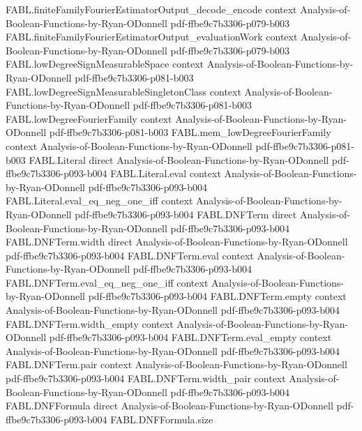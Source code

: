 \begin{theorem}
  {FABL.finiteFamilyFourierEstimatorOutput_decode_encode}
  {context}
  {Analysis-of-Boolean-Functions-by-Ryan-ODonnell}
  {pdf-ffbe9c7b3306-p079-b003}
\proofstep
  {FABL.finiteFamilyFourierEstimatorOutput_evaluationWork}
  {context}
  {Analysis-of-Boolean-Functions-by-Ryan-ODonnell}
  {pdf-ffbe9c7b3306-p079-b003}
\proofstep
  {FABL.lowDegreeSignMeasurableSpace}
  {context}
  {Analysis-of-Boolean-Functions-by-Ryan-ODonnell}
  {pdf-ffbe9c7b3306-p081-b003}
\proofstep
  {FABL.lowDegreeSignMeasurableSingletonClass}
  {context}
  {Analysis-of-Boolean-Functions-by-Ryan-ODonnell}
  {pdf-ffbe9c7b3306-p081-b003}
\proofstep
  {FABL.lowDegreeFourierFamily}
  {context}
  {Analysis-of-Boolean-Functions-by-Ryan-ODonnell}
  {pdf-ffbe9c7b3306-p081-b003}
\proofstep
  {FABL.mem_lowDegreeFourierFamily}
  {context}
  {Analysis-of-Boolean-Functions-by-Ryan-ODonnell}
  {pdf-ffbe9c7b3306-p081-b003}
\proofstep
  {FABL.Literal}
  {direct}
  {Analysis-of-Boolean-Functions-by-Ryan-ODonnell}
  {pdf-ffbe9c7b3306-p093-b004}
\proofstep
  {FABL.Literal.eval}
  {context}
  {Analysis-of-Boolean-Functions-by-Ryan-ODonnell}
  {pdf-ffbe9c7b3306-p093-b004}
\proofstep
  {FABL.Literal.eval_eq_neg_one_iff}
  {context}
  {Analysis-of-Boolean-Functions-by-Ryan-ODonnell}
  {pdf-ffbe9c7b3306-p093-b004}
\proofstep
  {FABL.DNFTerm}
  {direct}
  {Analysis-of-Boolean-Functions-by-Ryan-ODonnell}
  {pdf-ffbe9c7b3306-p093-b004}
\proofstep
  {FABL.DNFTerm.width}
  {direct}
  {Analysis-of-Boolean-Functions-by-Ryan-ODonnell}
  {pdf-ffbe9c7b3306-p093-b004}
\proofstep
  {FABL.DNFTerm.eval}
  {context}
  {Analysis-of-Boolean-Functions-by-Ryan-ODonnell}
  {pdf-ffbe9c7b3306-p093-b004}
\proofstep
  {FABL.DNFTerm.eval_eq_neg_one_iff}
  {context}
  {Analysis-of-Boolean-Functions-by-Ryan-ODonnell}
  {pdf-ffbe9c7b3306-p093-b004}
\proofstep
  {FABL.DNFTerm.empty}
  {context}
  {Analysis-of-Boolean-Functions-by-Ryan-ODonnell}
  {pdf-ffbe9c7b3306-p093-b004}
\proofstep
  {FABL.DNFTerm.width_empty}
  {context}
  {Analysis-of-Boolean-Functions-by-Ryan-ODonnell}
  {pdf-ffbe9c7b3306-p093-b004}
\proofstep
  {FABL.DNFTerm.eval_empty}
  {context}
  {Analysis-of-Boolean-Functions-by-Ryan-ODonnell}
  {pdf-ffbe9c7b3306-p093-b004}
\proofstep
  {FABL.DNFTerm.pair}
  {context}
  {Analysis-of-Boolean-Functions-by-Ryan-ODonnell}
  {pdf-ffbe9c7b3306-p093-b004}
\proofstep
  {FABL.DNFTerm.width_pair}
  {context}
  {Analysis-of-Boolean-Functions-by-Ryan-ODonnell}
  {pdf-ffbe9c7b3306-p093-b004}
\proofstep
  {FABL.DNFFormula}
  {direct}
  {Analysis-of-Boolean-Functions-by-Ryan-ODonnell}
  {pdf-ffbe9c7b3306-p093-b004}
\proofstep
  {FABL.DNFFormula.size}

\end{theorem}

